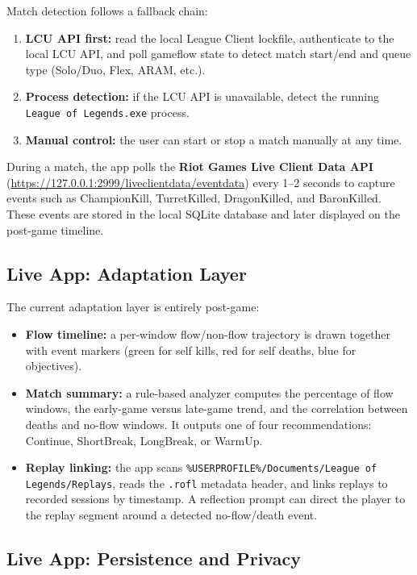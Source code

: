 Match detection follows a fallback chain:

\begin{enumerate}
    \item \textbf{LCU API first:} read the local League Client lockfile, authenticate to the local LCU API, and poll gameflow state to detect match start/end and queue type (Solo/Duo, Flex, ARAM, etc.).
    \item \textbf{Process detection:} if the LCU API is unavailable, detect the running \texttt{League of Legends.exe} process.
    \item \textbf{Manual control:} the user can start or stop a match manually at any time.
\end{enumerate}

During a match, the app polls the \textbf{Riot Games Live Client Data API} (\url{https://127.0.0.1:2999/liveclientdata/eventdata}) every 1--2 seconds to capture events such as ChampionKill, TurretKilled, DragonKilled, and BaronKilled. These events are stored in the local SQLite database and later displayed on the post-game timeline.

\subsection{Live App: Adaptation Layer}

The current adaptation layer is entirely post-game:

\begin{itemize}
    \item \textbf{Flow timeline:} a per-window flow/non-flow trajectory is drawn together with event markers (green for self kills, red for self deaths, blue for objectives).
    \item \textbf{Match summary:} a rule-based analyzer computes the percentage of flow windows, the early-game versus late-game trend, and the correlation between deaths and no-flow windows. It outputs one of four recommendations: Continue, ShortBreak, LongBreak, or WarmUp.
    \item \textbf{Replay linking:} the app scans \texttt{\%USERPROFILE\%/Documents/League of Legends/Replays}, reads the \texttt{.rofl} metadata header, and links replays to recorded sessions by timestamp. A reflection prompt can direct the player to the replay segment around a detected no-flow/death event.
\end{itemize}

\subsection{Live App: Persistence and Privacy}


